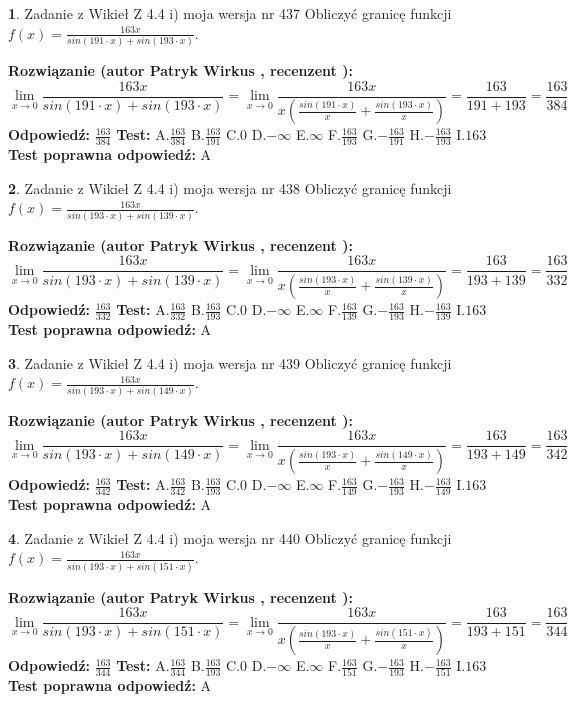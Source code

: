 \documentclass[12pt, a4paper]{article}
\theoremstyle{definition} %
\newtheorem{zad}{}
\newcommand{\zadStart}[1]{\begin{zad}#1\newline}
\newcommand{\zadStop}{\end{zad}}
\newcommand{\rozwStart}[2]{\noindent \textbf{Rozwiązanie (autor #1 , recenzent #2): }\newline}
\newcommand{\rozwStop}{\newline}
\newcommand{\odpStart}{\noindent \textbf{Odpowiedź:}\newline}
\newcommand{\odpStop}{\newline}
\newcommand{\testStart}{\noindent \textbf{Test:}\newline}
\newcommand{\testStop}{\newline}
\newcommand{\kluczStart}{\noindent \textbf{Test poprawna odpowiedź:}\newline}
\newcommand{\kluczStop}{\newline}
\begin{document}
\zadStart{Zadanie z Wikieł Z 4.4 i) moja wersja nr 437}
Obliczyć granicę funkcji $f(x)=\frac{163x}{sin(191\cdot x) +sin(193\cdot x)}$.
\zadStop
\rozwStart{Patryk Wirkus}{}
$$\lim\limits_{x\to 0}\frac{163x}{sin(191\cdot x) +sin(193\cdot x)}=\lim\limits_{x\to 0}\frac{163x}{x(\frac{sin(191\cdot x)}{x}+\frac{sin(193\cdot x)}{x})}=\frac{163}{191+193} = \frac{163}{384}$$
\rozwStop
\odpStart
$\frac{163}{384}$
\odpStop
\testStart
A.$\frac{163}{384}$
B.$\frac{163}{191}$
C.$0$
D.$-\infty$
E.$\infty$
F.$\frac{163}{193}$
G.$-\frac{163}{191}$
H.$-\frac{163}{193}$
I.$163$
\testStop
\kluczStart
A
\kluczStop



\zadStart{Zadanie z Wikieł Z 4.4 i) moja wersja nr 438}
Obliczyć granicę funkcji $f(x)=\frac{163x}{sin(193\cdot x) +sin(139\cdot x)}$.
\zadStop
\rozwStart{Patryk Wirkus}{}
$$\lim\limits_{x\to 0}\frac{163x}{sin(193\cdot x) +sin(139\cdot x)}=\lim\limits_{x\to 0}\frac{163x}{x(\frac{sin(193\cdot x)}{x}+\frac{sin(139\cdot x)}{x})}=\frac{163}{193+139} = \frac{163}{332}$$
\rozwStop
\odpStart
$\frac{163}{332}$
\odpStop
\testStart
A.$\frac{163}{332}$
B.$\frac{163}{193}$
C.$0$
D.$-\infty$
E.$\infty$
F.$\frac{163}{139}$
G.$-\frac{163}{193}$
H.$-\frac{163}{139}$
I.$163$
\testStop
\kluczStart
A
\kluczStop



\zadStart{Zadanie z Wikieł Z 4.4 i) moja wersja nr 439}
Obliczyć granicę funkcji $f(x)=\frac{163x}{sin(193\cdot x) +sin(149\cdot x)}$.
\zadStop
\rozwStart{Patryk Wirkus}{}
$$\lim\limits_{x\to 0}\frac{163x}{sin(193\cdot x) +sin(149\cdot x)}=\lim\limits_{x\to 0}\frac{163x}{x(\frac{sin(193\cdot x)}{x}+\frac{sin(149\cdot x)}{x})}=\frac{163}{193+149} = \frac{163}{342}$$
\rozwStop
\odpStart
$\frac{163}{342}$
\odpStop
\testStart
A.$\frac{163}{342}$
B.$\frac{163}{193}$
C.$0$
D.$-\infty$
E.$\infty$
F.$\frac{163}{149}$
G.$-\frac{163}{193}$
H.$-\frac{163}{149}$
I.$163$
\testStop
\kluczStart
A
\kluczStop



\zadStart{Zadanie z Wikieł Z 4.4 i) moja wersja nr 440}
Obliczyć granicę funkcji $f(x)=\frac{163x}{sin(193\cdot x) +sin(151\cdot x)}$.
\zadStop
\rozwStart{Patryk Wirkus}{}
$$\lim\limits_{x\to 0}\frac{163x}{sin(193\cdot x) +sin(151\cdot x)}=\lim\limits_{x\to 0}\frac{163x}{x(\frac{sin(193\cdot x)}{x}+\frac{sin(151\cdot x)}{x})}=\frac{163}{193+151} = \frac{163}{344}$$
\rozwStop
\odpStart
$\frac{163}{344}$
\odpStop
\testStart
A.$\frac{163}{344}$
B.$\frac{163}{193}$
C.$0$
D.$-\infty$
E.$\infty$
F.$\frac{163}{151}$
G.$-\frac{163}{193}$
H.$-\frac{163}{151}$
I.$163$
\testStop
\kluczStart
A
\kluczStop
\end{document}
